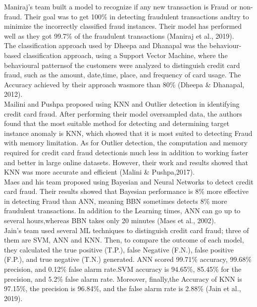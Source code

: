 Maniraj's team built a model to recognize if any new transaction is Fraud or non-fraud. Their 
goal was to get 100\% in detecting fraudulent transactions andtry to minimize the incorrectly classified fraud instances. Their model has performed well as they got 99.7\% of the fraudulent 
transactions (Maniraj et al., 2019).\cite{3}\\


The  classification  approach  used  by  Dheepa  and  Dhanapal  was  the  behaviour-based 
classification approach, using a Support Vector Machine, where the behavioural patternsof the customers were analyzed to distinguish credit card fraud, such as the amount, date,time, place, and frequency of card usage. The Accuracy achieved by their approach wasmore than 80\% (Dheepa & 
Dhanapal, 2012).\cite{4}\\


Mailini and Pushpa proposed using KNN and Outlier detection in identifying credit card fraud. After performing their model oversampled data, the authors found that the most suitable method for detecting and determining target instance anomaly is KNN, which showed that it is most suited to detecting Fraud with memory limitation. As for Outlier detection, the computation 
and memory required for credit card fraud detectionis much less in addition to working faster and better in large online datasets. However, their work and results showed that KNN was more accurate and efficient (Malini & Pushpa,2017).\cite{5}\\


Maes and his team proposed using Bayesian and Neural Networks to detect credit card fraud. 
Their results showed that Bayesian performance is 8\% more effective in detecting Fraud than 
ANN, meaning  BBN sometimes detects 8\% more fraudulent transactions. In addition to the 
Learning times, ANN can go up to several hours,whereas BBN takes only 20 minutes (Maes et al., 2002).\cite{6}\\


Jain’s team used several ML techniques to distinguish credit card fraud; three of them are SVM, ANN and KNN. Then, to compare the outcome of each model, they calculated the true positive (T.P.), false Negative (F.N.), false positive (F.P.), and true negative (T.N.) generated. ANN scored 99.71\% accuracy, 99.68\% precision, and 0.12\% false alarm rate.SVM accuracy is
94.65\%, 85.45\% for the precision, and 5.2\% false alarm rate. Moreover, finally,the Accuracy of KNN is 97.15\%, the precision is 96.84\%, and the false alarm rate is 2.88\% (Jain et al., 2019).\cite{7}\\


